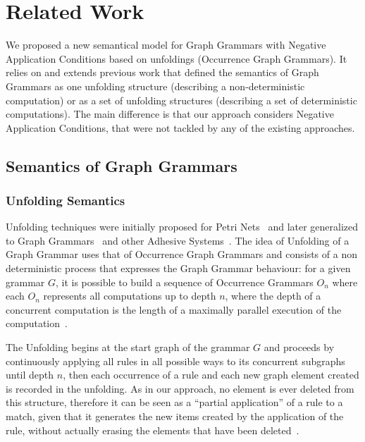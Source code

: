 \chapter{Related Work}\label{ch:related-work}

We proposed a new semantical model for Graph Grammars with Negative Application Conditions based on unfoldings (Occurrence Graph Grammars). It relies on and extends previous work that defined the semantics of Graph Grammars as one unfolding structure (describing a non-deterministic computation) or as a set of unfolding structures (describing  a set of deterministic computations). The main difference is that our approach considers Negative Application Conditions, that were not tackled by any of the existing approaches.

\section{Semantics of Graph Grammars}

\subsection{Unfolding Semantics}

  Unfolding techniques were initially proposed for Petri Nets~\cite{Nielsen1981} and later generalized to Graph Grammars~\cite{Ribeiro1996} and other Adhesive Systems~\cite{Baldan2009}.
  The idea of Unfolding of a Graph Grammar uses that of Occurrence Graph Grammars and consists of a non deterministic process that expresses the Graph Grammar behaviour: for a given grammar $G$, it is possible to build a sequence of Occurrence Grammars $O_n$ where each $O_n$ represents all computations up to depth $n$, where the depth of a concurrent computation is the length of a maximally parallel execution of the computation~\cite{Baldan2009}.

  The Unfolding begins at the start graph of the grammar $G$ and proceeds by continuously applying all rules in all possible ways to its concurrent subgraphs until depth $n$, then each occurrence of a rule and each new graph element created is recorded in the unfolding.
  As in our approach, no element is ever deleted from this structure, therefore it can be seen as a ``partial application'' of a rule to a match, given that it generates the new items created by the application of the rule, without actually erasing the elements that have been deleted~\cite{Baldan2008}.%

